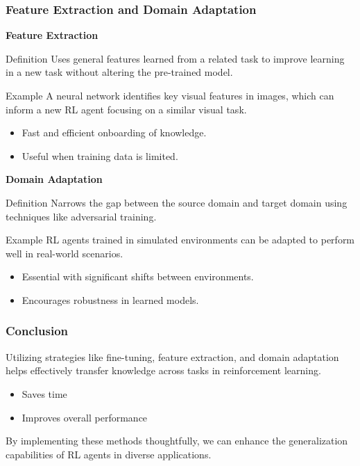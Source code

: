 \documentclass[aspectratio=169]{beamer}
\begin{document}
\begin{frame}[fragile]
  \frametitle{Feature Extraction and Domain Adaptation}
  
  \textbf{Feature Extraction}
  \begin{block}{Definition}
    Uses general features learned from a related task to improve learning in a new task without altering the pre-trained model.
  \end{block}
  \begin{block}{Example}
    A neural network identifies key visual features in images, which can inform a new RL agent focusing on a similar visual task.
  \end{block}

  \begin{itemize}
    \item Fast and efficient onboarding of knowledge.
    \item Useful when training data is limited.
  \end{itemize}

  \vspace{1cm} %
  \textbf{Domain Adaptation}
  \begin{block}{Definition}
    Narrows the gap between the source domain and target domain using techniques like adversarial training.
  \end{block}
  \begin{block}{Example}
    RL agents trained in simulated environments can be adapted to perform well in real-world scenarios.
  \end{block}

  \begin{itemize}
    \item Essential with significant shifts between environments.
    \item Encourages robustness in learned models.
  \end{itemize}
\end{frame}

\begin{frame}[fragile]
  \frametitle{Conclusion}
  
  Utilizing strategies like fine-tuning, feature extraction, and domain adaptation helps effectively transfer knowledge across tasks in reinforcement learning.
  
  \begin{itemize}
    \item Saves time
    \item Improves overall performance
  \end{itemize}
  
  By implementing these methods thoughtfully, we can enhance the generalization capabilities of RL agents in diverse applications.
\end{frame}
\end{document}
